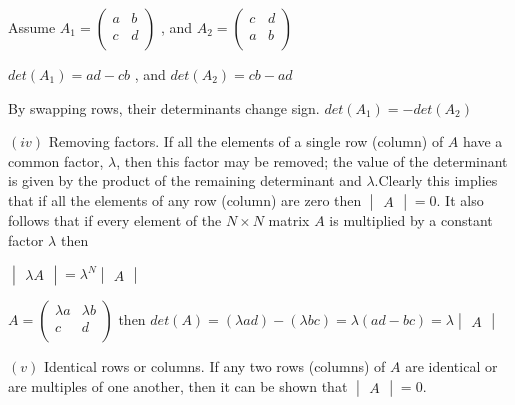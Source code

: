 \documentclass[fleqn]{article}
\begin{document}
\begin{enumerate}
    \textcolor{hwColor}{
      Assume
      $
      A_1=\begin{pmatrix}
        a & b \\
        c & d \\
      \end{pmatrix}
      $
      , and
      $
      A_2=\begin{pmatrix}
        c & d \\
        a & b \\
      \end{pmatrix}
      $
    }

    \textcolor{hwColor}{
      $
      det(A_1)=ad-cb
      $
      , and
      $
      det(A_2)=cb-ad
      $
    }

    \textcolor{hwColor}{
      By swapping rows, their determinants change sign.  $det(A_1)=-det(A_2)$
    }

    \bigbreak

    $(iv)$ Removing factors. If all the elements of a single row (column) of $A$ have a common factor, $\lambda$, then this factor may be removed;  the value of the determinant is given by the product of the remaining determinant and $\lambda$.Clearly this implies that if all the elements of any row (column) are zero then $\begin{vmatrix}
      A
    \end{vmatrix}=0$. It also follows that if every element of the $N \times N$ matrix $A$ is multiplied by a constant factor $\lambda$ then

    $\begin{vmatrix}
      \lambda A
    \end{vmatrix}= \lambda^N \begin{vmatrix}
      A
    \end{vmatrix}
    $

    \textcolor{hwColor}{
      $
      A=\begin{pmatrix}
        \lambda a & \lambda b \\
        c & d \\
      \end{pmatrix}
      $
      then 
      $
      det(A)= (\lambda ad)-(\lambda bc)=\lambda (ad-bc)=\lambda \begin{vmatrix}
        A
      \end{vmatrix}
      $
    }

    \bigbreak

    $(v)$ Identical rows or columns. If any two rows (columns) of $A$ are identical or are multiples of one another, then it can be shown that $\begin{vmatrix}
      A
    \end{vmatrix}=0$.


\end{enumerate}
\end{document}
